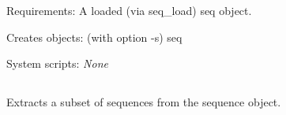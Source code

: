 \begin{description}
\begin{enumerate}
\begin{verbatim}
\end{verbatim}

\end{enumerate}


\item{Requirements:} A loaded (via seq\_load) seq object.


\item{Creates objects:} (with option -s) seq


\item{System scripts:} {\em None}

\end{description}



\subsection[seq\_pick]{  }



Extracts a subset of sequences from the sequence object.


